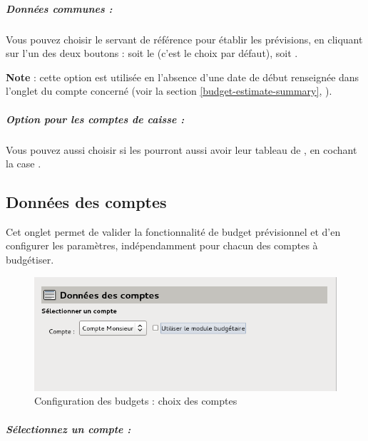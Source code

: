 \subparagraph{Données communes :\label{setup-budget-general-common}}

Vous pouvez choisir le  servant de référence pour établir les prévisions, en cliquant sur l'un des deux boutons : soit le  (c'est le choix par défaut), soit . 

\textbf{Note} : cette option est utilisée en l'absence d'une date de début renseignée dans l'onglet  du compte concerné (voir la section \vref{budget-estimate-summary}, ).


\subparagraph{Option pour les comptes de caisse :\label{setup-budget-general-cash}}

Vous pouvez aussi choisir si les  pourront aussi avoir leur tableau de , en cochant la case .



\subsection{Données des comptes\label{setup-budget-data}}

Cet onglet permet de valider la fonctionnalité de budget prévisionnel et d'en configurer les paramètres, indépendamment pour chacun des comptes à budgétiser. 

\ifIllustration
\begin{figure}[htbp]
\begin{center}
\includegraphics[scale=0.5]{image/screenshot/setup_budget_data1}
\end{center}
\caption{Configuration des budgets : choix des comptes}
\label{setup-budgetData1-img}
\end{figure}
\fi

\subparagraph{Sélectionnez un compte :\label{setup-budget-data-select}}

